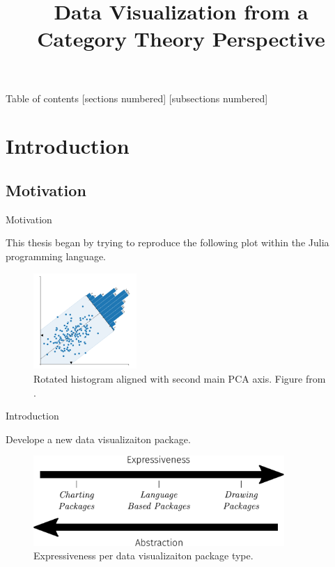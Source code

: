 \documentclass[aspectratio=169,xcolor=dvipsnames,9pt]{beamer}
\title{\textbf{Data Visualization from a\\Category Theory Perspective}}
\date{}
\begin{document}
\maketitle

\begin{frame}{Table of contents}
	[sections numbered]
	[subsections numbered]
	\tableofcontents[sectionstyle=show, subsectionstyle=show]
\end{frame}

\AtBeginSection{}
\section[Introduction]{Introduction}
\subsection[Motivation]{Motivation}
\begin{frame}[fragile]{Motivation}

	This thesis began by trying to reproduce the following plot
	within the Julia programming language.

	\begin{figure}[H]
		\begin{center}
			\includegraphics[width=0.35\textwidth]{./figures/rotated-histogram.png}
		\end{center}
		\caption{Rotated histogram aligned with second main PCA axis. Figure from \citet{rougier2021scientific}.}
		\label{fig:rotated-histogram}
	\end{figure}

\end{frame}

\begin{frame}[fragile]{Introduction}

	Develope a new data visualizaiton package.
	\begin{figure}
		\begin{center}
			\includegraphics[width=0.85\textwidth]{./figures/expressiveness}
		\end{center}
		\caption{Expressiveness per data visualizaiton package type.}
		\label{fig:expressiveness}
	\end{figure}

\end{frame}
\end{document}
